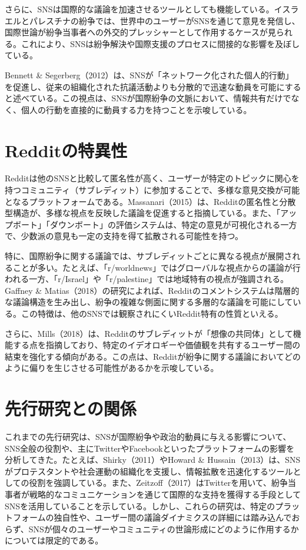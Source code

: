 \documentclass[11pt, a4j]{jreport}
\begin{document}
    さらに、SNSは国際的な議論を加速させるツールとしても機能している。イスラエルとパレスチナの紛争では、世界中のユーザーがSNSを通じて意見を発信し、国際世論が紛争当事者への外交的プレッシャーとして作用するケースが見られる。これにより、SNSは紛争解決や国際支援のプロセスに間接的な影響を及ぼしている。

    Bennett \& Segerberg（2012）は、SNSが「ネットワーク化された個人的行動」を促進し、従来の組織化された抗議活動よりも分散的で迅速な動員を可能にすると述べている。この視点は、SNSが国際紛争の文脈において、情報共有だけでなく、個人の行動を直接的に動員する力を持つことを示唆している。

    \section{Redditの特異性}
    Redditは他のSNSと比較して匿名性が高く、ユーザーが特定のトピックに関心を持つコミュニティ（サブレディット）に参加することで、多様な意見交換が可能となるプラットフォームである。Massanari（2015）は、Redditの匿名性と分散型構造が、多様な視点を反映した議論を促進すると指摘している。また、「アップボート」「ダウンボート」の評価システムは、特定の意見が可視化される一方で、少数派の意見も一定の支持を得て拡散される可能性を持つ。

    特に、国際紛争に関する議論では、サブレディットごとに異なる視点が展開されることが多い。たとえば、「r/worldnews」ではグローバルな視点からの議論が行われる一方、「r/Israel」や「r/palestine」では地域特有の視点が強調される。Gaffney \& Matias（2018）の研究によれば、Redditのコメントシステムは階層的な議論構造を生み出し、紛争の複雑な側面に関する多層的な議論を可能にしている。この特徴は、他のSNSでは観察されにくいReddit特有の性質といえる。

    さらに、Mills（2018）は、Redditのサブレディットが「想像の共同体」として機能する点を指摘しており、特定のイデオロギーや価値観を共有するユーザー間の結束を強化する傾向がある。この点は、Redditが紛争に関する議論においてどのように偏りを生じさせる可能性があるかを示唆している。

    \section{先行研究との関係}
    これまでの先行研究は、SNSが国際紛争や政治的動員に与える影響について、SNS全般の役割や、主にTwitterやFacebookといったプラットフォームの影響を分析してきた。たとえば、Shirky（2011）やHoward \& Hussain（2013）は、SNSがプロテスタントや社会運動の組織化を支援し、情報拡散を迅速化するツールとしての役割を強調している。また、Zeitzoff（2017）はTwitterを用いて、紛争当事者が戦略的なコミュニケーションを通じて国際的な支持を獲得する手段としてSNSを活用していることを示している。しかし、これらの研究は、特定のプラットフォームの独自性や、ユーザー間の議論ダイナミクスの詳細には踏み込んでおらず、SNSが個々のユーザーやコミュニティの世論形成にどのように作用するかについては限定的である。
\end{document}
